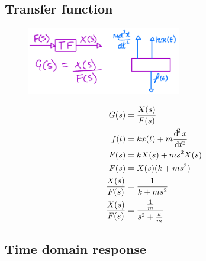 \documentclass[12pt]{article}
\numberwithin{equation}{section}
\begin{document}
\subsection*{Transfer function}
\begin{figure}[H]
  \centering
  \includegraphics[width=0.6\textwidth]{./img/2-4blockdiagram.png}
\end{figure}
\begin{align}
  G(s) &= \frac{X(s)}{F(s)}\\
  f(t) &= kx(t) + m \frac{\dif ^2 x}{\dif t^2}\\
  F(s) &= kX(s) + ms^2 X(s)\\
  F(s) &= X(s) (k + ms^2)\\
  \frac{X(s)}{F(s)} &= \frac{1}{k + ms^2}\\
  \frac{X(s)}{F(s)} &= \frac{\frac{1}{m}}{s^2 + \frac{k}{m}}
\end{align}
\subsection*{Time domain response}
\end{document}
